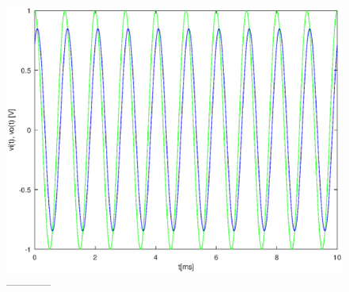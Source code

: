 \begin{equation}
  
  \label{eq:vo_for}
\end{equation}

\begin{figure}[h] \centering
\includegraphics[width=0.8\linewidth]{forced.eps}
\caption{------------}
\label{fig:forced}
\end{figure}
